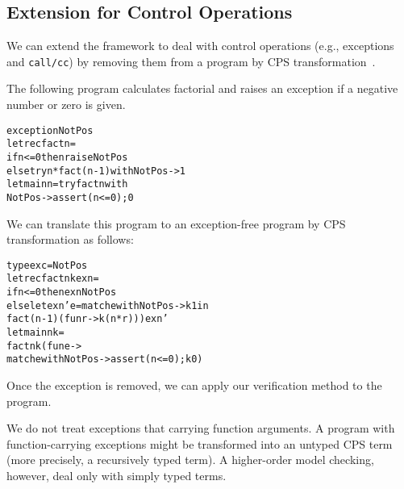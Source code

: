 \subsection{Extension for Control Operations}
\label{sec:control} We can extend the framework to deal with control
operations (e.g., exceptions and \texttt{call/cc}) by removing them
from a program by CPS transformation~\cite{Nielsen2001}.

The following program calculates factorial and raises an exception if
a negative number or zero is given.
\begin{alltt}
exception NotPos
let rec fact n =
  if n <= 0 then raise NotPos
  else try n * fact (n - 1) with NotPos -> 1
let main n = try fact n with
               NotPos -> assert (n <= 0); 0
\end{alltt}
We can translate this program to an exception-free program by CPS transformation as follows:
\begin{alltt}
type exc = NotPos
let rec fact n k exn =
  if n <= 0 then exn NotPos
  else let exn' e = match e with NotPos -> k 1 in
         fact (n - 1) (fun r -> k (n * r))) exn'
let main n k =
  fact n k (fun e ->
    match e with NotPos -> assert (n <= 0); k 0)
\end{alltt}
Once the exception is removed, we can apply our verification method to the
program.

We do not treat exceptions that carrying function arguments.
A program with function-carrying exceptions might be transformed into an
untyped CPS term (more precisely, a recursively typed term).  A
higher-order model checking, however, deal only with simply typed terms.
